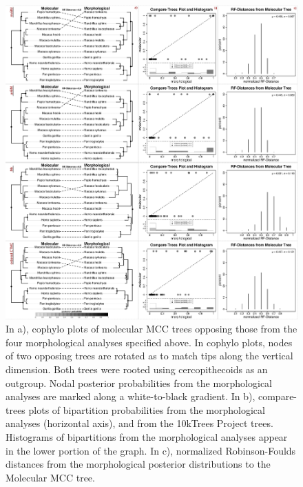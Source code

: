 \documentclass[10pt, twocolumn, twoside]{article}
\begin{document}
\begin{figure}[h]
\centering
\includegraphics[width=160mm]{figures/harvati_figure1_final.pdf}
\caption[Visualizing Results of Model-Based Phylogenetic Analyses of Catarrhine Landmark Data]{In a), cophylo plots of molecular MCC trees opposing those from the four morphological analyses specified above. In cophylo plots, nodes of two opposing trees are rotated as to match tips along the vertical dimension. Both trees were rooted using cercopithecoids as an outgroup. Nodal posterior probabilities from the morphological analyses are marked along a white-to-black gradient. In b), compare-trees plots of bipartition probabilities from the morphological analyses (horizontal axis), and from the 10kTrees Project trees. Histograms of bipartitions from the morphological analyses appear in the lower portion of the graph. In c), normalized Robinson-Foulds distances from the morphological posterior distributions to the Molecular MCC tree.  \label{overflow}
\label{fig:harvatiFigure1}}
\end{figure}
\end{document}
